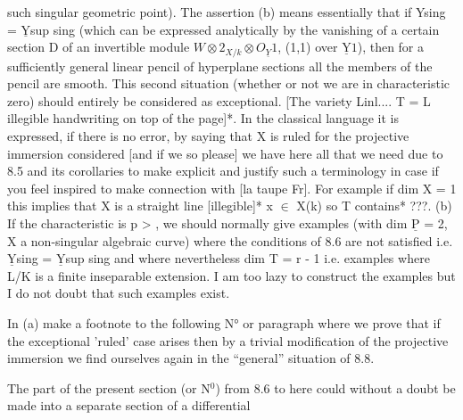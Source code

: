 
such singular geometric point).  The assertion (b) means
essentially that if Ysing = $\underline{\text{Y}}$sup sing (which can be expressed
analytically by the vanishing of a certain section D of an
invertible module $W\otimes 2_{X/k} \otimes O_{\underline{Y}}1$, (1,1) over $\underline{\text{Y}}1$), then for a
sufficiently general linear pencil of hyperplane sections all the
members of the pencil are smooth.  This second situation (whether
or not we are in characteristic zero) should entirely be
considered as exceptional.  [The variety Linl.... T = L illegible
handwriting on top of the page]*.  In the classical language it is
expressed, if there is no error, by saying that X is ruled for the
projective immersion considered [and if we so please] we have here
all that we need due to 8.5 and its corollaries to make explicit
and justify such a terminology in case if you feel inspired to
make connection with [la taupe Fr].  For example if dim X = 1 this
implies that X is a straight line [illegible]* x $\in$ X(k) so T
contains* ???.  (b) If the characteristic is p > , we should
normally give examples (with dim $\underline{\text{P}}$ = 2, X a non-singular algebraic
curve) where the conditions of 8.6 are not satisfied i.e. $\underline{\text{Y}}$sing =
$\underline{\text{Y}}$sup sing and where nevertheless dim T = r - 1 i.e. examples where
L/K is a finite inseparable extension.  I am too lazy to construct
the examples but I do not doubt that such examples exist.

In (a) make a footnote to the following N° or paragraph where
we prove that if the exceptional 'ruled' case arises then by a
trivial modification of the projective immersion we find ourselves
again in the ``general'' situation of 8.8.

The part of the present section (or N$^{0}$) from 8.6 to here could
without a doubt be made into a separate section of a differential

